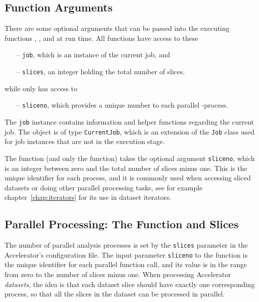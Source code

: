 \subsection{Function Arguments}
There are some optional arguments that can be passed into the
executing functions \prepare, \analysis, and \synthesis at run time.
All functions have access to these
\begin{itemize}
\item[--] \texttt{job}, which is an instance of the current job, and
\item[--] \texttt{slices}, an integer holding the total number of slices.
\end{itemize}
while only \analysis has access to
\begin{itemize}
\item[--] \texttt{sliceno}, which provides a unique number to each
  parallel \analysis-process.
\end{itemize}
The \texttt{job} instance contains information and helper functions
regarding the current job.  The object is of type \texttt{CurrentJob},
which is an extension of the \texttt{Job} class used for job instances
that are not in the execution stage.

The \analysis function (and only the \analysis function) takes the
optional argument \texttt{sliceno}, which is an integer between zero
and the total number of slices minus one.  This is the unique
identifier for each \analysis process, and it is commonly used when
accessing sliced datasets or doing other parallel processing tasks,
see for example chapter~\ref{chap:iterators} for its use in dataset
iterators.



\subsection{Parallel Processing:  The \analysis Function and Slices}
The number of parallel analysis processes is set by the
\texttt{slices} parameter in the Accelerator's configuration file.
The input parameter \texttt{sliceno} to the \analysis function is the
unique identifier for each parallel function call, and its value is in
the range from zero to the number of slices minus one.  When
processing Accelerator \textsl{datasets}, the idea is that each
dataset slice should have exactly one corresponding \analysis process,
so that all the slices in the dataset can be processed in parallel.


